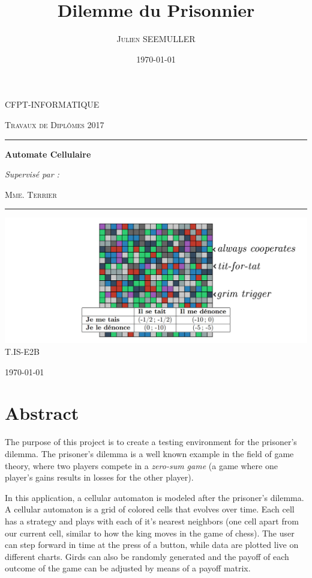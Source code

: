 \documentclass[a4paper, french]{article}
\title{Dilemme du Prisonnier}
\author{\textsc{Julien SEEMULLER}}
\date{\today}
\newcommand{\subtitle}{Automate Cellulaire}
\newcommand{\lesson}{Travaux de Diplômes 2017}
\newcommand{\class}{T.IS-E2B}
\newcommand{\teacher}{Mme. Terrier}
\begin{document}
\begin{titlepage}
	\centering
	{\scshape\LARGE CFPT-INFORMATIQUE \par}
	\vspace{0.25cm}
	{\scshape\lesson\par}
	\vspace{3cm}
	
	\hrule
	{\huge\bfseries\textsc\@title\par}
	{\Large\bfseries\textsc\subtitle\par}
	\vspace{0.5cm}
	{\itshape\@author\par}
	\vspace{1cm}
	{\textit{Supervisé par :}  \par \textsc{\teacher}}\par
	\vspace{0.5cm}
	\hrule
	
	\vfill
	\includegraphics[width=\linewidth]{logo.png}
	\vfill
	\textsc{\class}
	\vspace{1cm}
	
	{\large\today\par}
\end{titlepage}

\pagebreak


\section{Abstract}
The purpose of this project is to create a testing environment for the prisoner's dilemma. The prisoner's dilemma is a well known example in the field of game theory, where two players compete in a \textit{zero-sum game} (a game where one player's gains results in losses for the other player). 

In this application, a cellular automaton is modeled after the prisoner's dilemma. A cellular automaton is a grid of colored cells that evolves over time. Each cell has a strategy and plays with each of it's nearest neighbors (one cell apart from our current cell, similar to how the king moves in the game of chess). The user can step forward in time at the press of a button, while data are plotted live on different charts. Girds can also be randomly generated and the payoff of each outcome of the game can be adjusted by means of a payoff matrix.
\end{document}
